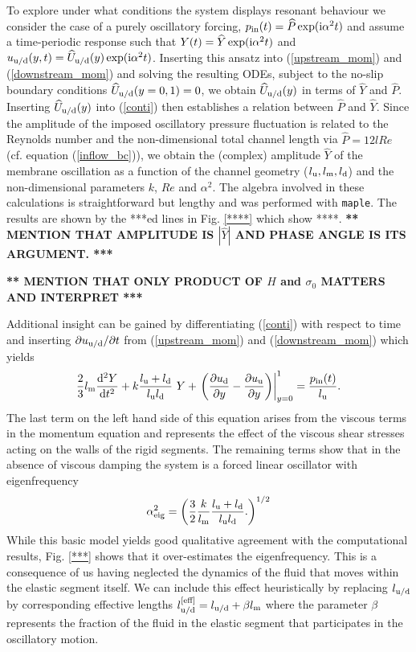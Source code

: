 \documentclass[aps,prl,reprint,superscriptaddress,floatfix]{revtex4-1}
\newcommand{\Rey}{\mathit{Re}}
\newcommand{\be}{\begin{equation}}
\newcommand{\ee}{\end{equation}}
\begin{document}
To explore under what conditions the system displays resonant
behaviour we consider the case of a purely oscillatory forcing, $p_{\rm in}(t) =
\widehat{P} \exp({\rm i}\alpha^2 t)$ and assume a time-periodic response such
that $Y(t) = \widehat{Y} \exp({\rm i}\alpha^2 t)$ and
$u_{\rm u/d}(y,t) = \widehat{U}_{\rm u/d}(y) \exp({\rm i}\alpha^2
t)$. Inserting this ansatz into (\ref{upstream_mom}) and
(\ref{downstream_mom}) and solving the resulting ODEs, subject to
the no-slip boundary conditions $\widehat{U}_{\rm u/d}(y=0,1)=0$,
we obtain $\widehat{U}_{\rm u/d}(y)$ in terms
of $\widehat{Y}$ and $\widehat{P}$.
Inserting $\widehat{U}_{\rm u/d}(y)$ into (\ref{conti}) then
establishes a relation between $\widehat{P}$ and $\widehat{Y}$. Since the
amplitude of the imposed oscillatory pressure fluctuation is related
to the Reynolds number and the non-dimensional total channel length
via $\widehat{P} = 12 l \Rey$ (cf. equation (\ref{inflow_bc})), we obtain
the (complex) amplitude $\widehat{Y}$ of the membrane oscillation
as a function of the channel geometry ($l_{\rm u}, l_{\rm m}, l_{\rm
  d}$) and the non-dimensional parameters $k$, $Re$ and $\alpha^2$.
The algebra involved in these calculations is straightforward but
lengthy and was performed with {\tt maple}. The results are
shown by the ***ed lines in Fig. \ref{****} which show ****.
{\bf *** MENTION THAT AMPLITUDE IS $|\widehat{Y}|$ AND PHASE
  ANGLE IS ITS ARGUMENT. ***}

{\bf *** MENTION THAT ONLY PRODUCT OF $H$ and $\sigma_0$ MATTERS AND
  INTERPRET ***}

 Additional insight can be gained by differentiating (\ref{conti})
with respect to time and inserting $\partial u_{\rm u/d}/\partial t$
from (\ref{upstream_mom}) and (\ref{downstream_mom}) which yields
\be
\frac{2}{3}l_{\rm m} \frac{{\rm d}^2 Y}{{\rm d}t^2} +
k \frac{l_{\rm u} + l_{\rm d}}{l_{\rm u} l_{\rm d}} \ Y
+ \left.
\left( \frac{\partial u_{\rm d}}{\partial y} -
       \frac{\partial u_{\rm u}}{\partial y} \right)
\right|_{y=0}^1 = \frac{p_{\rm in}(t)}{l_{\rm u}}.
\ee
The last term on the left hand side of this equation arises from the
viscous terms in the momentum equation and represents the effect of
the viscous shear stresses acting on the walls of the rigid segments.
The remaining terms show that in the absence of viscous damping
the system is a forced linear oscillator with eigenfrequency
\be
\alpha_{\rm eig}^2 = \left( 
\frac{3}{2} \frac{k}{l_{\rm m}}
\frac{l_{\rm u} + l_{\rm d}}{l_{\rm u} l_{\rm d}}.
\right)^{1/2}
\ee
While this basic model yields good qualitative agreement
with the computational results, Fig. \ref{***} shows that
it over-estimates the eigenfrequency. This is a consequence of us
having neglected the dynamics of the fluid that moves within the
elastic segment itself. We can include this effect heuristically by replacing
$l_{\rm u/d}$ by corresponding effective lengths $l_{\rm u/d}^{\rm [eff]} =
l_{\rm u/d} + \beta l_{\rm m}$ where the parameter $\beta$
represents the fraction of the fluid in the elastic
segment that participates in the oscillatory motion.
\end{document}
